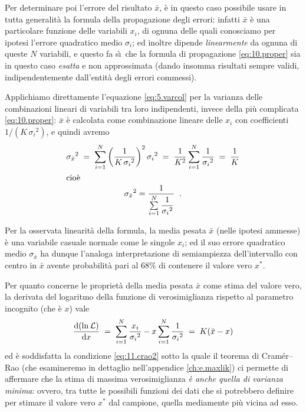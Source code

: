 Per determinare poi l'errore del risultato $ \bar x $, \`e
in questo caso possibile usare in tutta generalit\`a la
formula della propagazione degli errori: infatti $ \bar x $
\`e una particolare funzione delle variabili $x_i$, di
ognuna delle quali conosciamo per ipotesi l'errore
quadratico medio $\sigma_i$; ed inoltre dipende
\emph{linearmente} da ognuna di queste $N$ variabili, e
questo fa s\`\i\ che la formula di propagazione
\eqref{eq:10.proper} sia in questo caso \emph{esatta} e non
approssimata (dando insomma risultati sempre validi,
indipendentemente dall'entit\`a degli errori commessi).

Applichiamo direttamente l'equazione \eqref{eq:5.varcol} per
la varianza delle combinazioni lineari di variabili tra loro
indipendenti, invece della pi\`u complicata
\eqref{eq:10.proper}: $\bar x$ \`e calcolata come
combinazione lineare delle $x_i$ con coefficienti $1/\left(
  K \, {\sigma_i}^2 \right)$, e quindi avremo
\begin{gather}
  {\sigma_{\bar x}}^2 \; = \; \sum_{i=1}^N
    \left( \frac{1}{ K \, {\sigma_i}^2 }
    \right)^2 {\sigma_i}^2\; = \;
    \frac{1}{K^2} \sum_{i=1}^N \frac{1}
   {{\sigma_i}^2} \; = \; \frac{1}{K} \notag \\
  \intertext{cio\`e}
  {\sigma_{\bar x}}^2 = \frac{1} {\sum
    \limits_{i=1}^N \dfrac{1}{{\sigma_i}^2} }
    \;\; . \label{eq:11.ermear}
\end{gather}

Per la osservata linearit\`a della formula, la media pesata
$\bar x$ (nelle ipotesi ammesse) \`e una variabile casuale
normale come le singole $x_i$; ed il suo errore quadratico
medio $\sigma_{\bar x}$ ha dunque l'analoga interpretazione
di semiampiezza dell'intervallo con centro in $\bar x$
avente probabilit\`a pari al 68\% di contenere il valore
vero $x^*$.

Per quanto concerne le propriet\`a della media pesata $\bar
x$ come stima del valore vero, la derivata del logaritmo
della funzione di verosimiglianza rispetto al parametro
incognito (che \`e $x$) vale
\begin{equation*}
  \frac{\mathrm{d} (\ln \mathcal{L}) }{\mathrm{d} x} \; = \; \sum_{i=1}^N
  \frac{x_i}{{\sigma_i}^2} - x \sum_{i=1}^N
  \frac{1}{{\sigma_i}^2} \; = \; K ( \bar x - x )
\end{equation*}
ed \`e soddisfatta la condizione \eqref{eq:11.crao2} sotto
la quale il teorema di Cram\'er--Rao%
(che esamineremo in dettaglio nell'appendice
\ref{ch:e.maxlik}) ci permette di affermare che la stima di
massima verosimiglianza \emph{\`e anche quella di varianza
  minima}: ovvero, tra tutte le possibili funzioni dei dati
che si potrebbero definire per stimare il valore vero $x^*$
dal campione, quella mediamente pi\`u vicina ad esso.%

